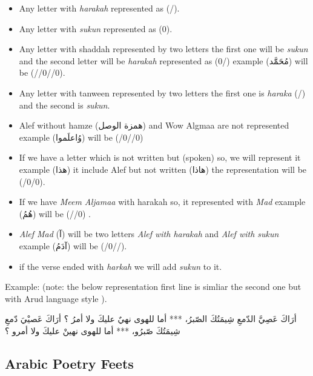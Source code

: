   \begin{itemize}
  \item Any letter with \textit{harakah} represented as (/).
  \item Any letter with \textit{sukun} represented as (0).
  \item Any letter with shaddah represented by two letters the first one will be \textit{sukun} and the second letter will be \textit{harakah} represented as (0/) example (\textarabic{مُحَمََّد}) will be (//0//0).
  \item Any letter with tanween represented by two letters the first one is \textit{haraka} (/) and the second is \textit{sukun}.
  \item Alef without hamze (\textarabic{همزة الوصل}) and Wow Algmaa are not represented example (\textarabic{وُاعلَموا}) will be (/0//0)
  \item If we have a letter which is not written but (spoken) so, we will represent it example (\textarabic{هذا}) it include Alef but not written (\textarabic{هاذا}) the representation will be (/0/0).
  \item If we have \textit{Meem Aljamaa} with harakah so, it represented with \textit{Mad} example (\textarabic{هُمُ}) will be (//0) .
  \item \textit{Alef Mad} (\textarabic{آ}) will be two letters \textit{Alef with harakah} and \textit{Alef with sukun} example (\textarabic{آدَمُ}) will be (/0//).
    \item if the verse ended with \textit{harkah} we will add \textit{sukun} to it.


    \end{itemize}
Example: (note: the below representation first line is simliar the second one but with Arud language style ).
\begin{Arabic}
  \begin{traditionalpoem*}

    أرَاكَ عَصِيَّ الدّمعِ شِيمَتُكَ الصّبرُ، *** أما للهوى نهيٌ عليكَ ولا أمرُ ؟
     أرَاكَ عَصيْيَ دّمعِ شِيمَتُكَ صّبرُو، ***  أما للهوى نهينْ عليكَ ولا أمرو ؟
    
	\end{traditionalpoem*}
\end{Arabic}
\newpage

\subsection{Arabic Poetry Feets}

